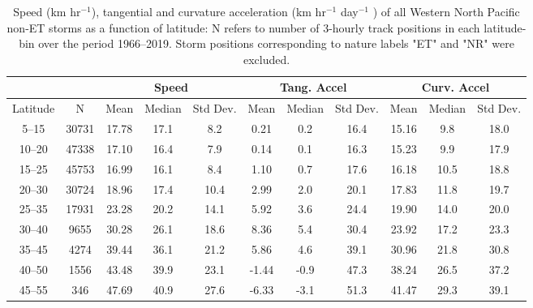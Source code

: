 \documentclass[wcd,manuscript]{copernicus}
\begin{document}
\begin{table*}[t]
\caption{Speed (km hr$^{-1}$), tangential and curvature acceleration  (km hr$^{-1}$ day$^{-1}$ ) of all Western North Pacific non-ET storms as a function of latitude: N refers to number of 3-hourly track positions in each latitude-bin over the period 1966--2019. Storm positions corresponding to 
nature labels "ET" and "NR" were excluded.}

\begin{tabular}{cc|ccc|ccc|ccc}
\tophline
& & \multicolumn{3}{|c|}{Speed} & \multicolumn{3}{c|}{Tang. Accel} & \multicolumn{3}{c}{Curv. Accel}\\
\hline
       Latitude &     N &  Mean & Median & Std Dev. & Mean & Median &  Std Dev.& Mean & Median & Std Dev.\\
	  5--15 & 30731 & 17.78 &  17.1 &   8.2 &  0.21 &   0.2 &  16.4 & 15.16 &   9.8 &  18.0 \\
	 10--20 & 47338 & 17.10 &  16.4 &   7.9 &  0.14 &   0.1 &  16.3 & 15.23 &   9.9 &  17.9 \\
	 15--25 & 45753 & 16.99 &  16.1 &   8.4 &  1.10 &   0.7 &  17.6 & 16.18 &  10.5 &  18.8 \\
	 20--30 & 30724 & 18.96 &  17.4 &  10.4 &  2.99 &   2.0 &  20.1 & 17.83 &  11.8 &  19.7 \\
	 25--35 & 17931 & 23.28 &  20.2 &  14.1 &  5.92 &   3.6 &  24.4 & 19.90 &  14.0 &  20.0 \\
	 30--40 &  9655 & 30.28 &  26.1 &  18.6 &  8.36 &   5.4 &  30.4 & 23.92 &  17.2 &  23.3 \\
	 35--45 &  4274 & 39.44 &  36.1 &  21.2 &  5.86 &   4.6 &  39.1 & 30.96 &  21.8 &  30.8 \\
	 40--50 &  1556 & 43.48 &  39.9 &  23.1 & -1.44 &  -0.9 &  47.3 & 38.24 &  26.5 &  37.2 \\
	 45--55 &   346 & 47.69 &  40.9 &  27.6 & -6.33 &  -3.1 &  51.3 & 41.47 &  29.3 &  39.1 \\
\hline
\end{tabular}
\label{tab:WPSA}
\end{table*}
\end{document}
